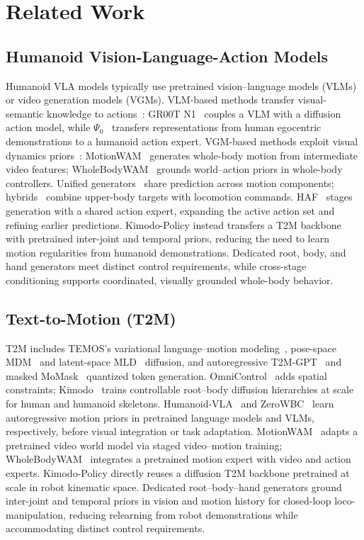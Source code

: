 \section{Related Work}
\label{sec:related_work}


% 

\subsection{Humanoid Vision-Language-Action Models}
Humanoid VLA models typically use pretrained vision--language models (VLMs) or video generation models (VGMs).
VLM-based methods transfer visual-semantic knowledge to actions~\cite{grootn1,psi0,humanoidexo,openhlm}: GR00T N1~\cite{grootn1} couples a VLM with a diffusion action model, while $\Psi_0$~\cite{psi0} transfers representations from human egocentric demonstrations to a humanoid action expert.
VGM-based methods exploit visual dynamics priors~\cite{motionwam,wholebodywam_wbc}: MotionWAM~\cite{motionwam} generates whole-body motion from intermediate video features; WholeBodyWAM~\cite{wholebodywam_wbc} grounds world--action priors in whole-body controllers.
Unified generators~\cite{openhlm,motionwam} share prediction across motion components; hybrids~\cite{humanoidexo,wholebodyvla} combine upper-body targets with locomotion commands.
HAF~\cite{haf} stages generation with a shared action expert, expanding the active action set and refining earlier predictions.
Kimodo-Policy instead transfers a T2M backbone with pretrained inter-joint and temporal priors, reducing the need to learn motion regularities from humanoid demonstrations. Dedicated root, body, and hand generators meet distinct control requirements, while cross-stage conditioning supports coordinated, visually grounded whole-body behavior.

% 

\subsection{Text-to-Motion (T2M)}
T2M includes TEMOS's variational language--motion modeling~\cite{temos}, pose-space MDM~\cite{mdm} and latent-space MLD~\cite{mld} diffusion, and autoregressive T2M-GPT~\cite{t2mgpt} and masked MoMask~\cite{momask} quantized token generation. OmniControl~\cite{omnicontrol} adds spatial constraints; Kimodo~\cite{kimodo} trains controllable root--body diffusion hierarchies at scale for human and humanoid skeletons. Humanoid-VLA~\cite{humanoidvla} and ZeroWBC~\cite{zerowbc} learn autoregressive motion priors in pretrained language models and VLMs, respectively, before visual integration or task adaptation. MotionWAM~\cite{motionwam} adapts a pretrained video world model via staged video--motion training; WholeBodyWAM~\cite{wholebodywam_motionpriors} integrates a pretrained motion expert with video and action experts. Kimodo-Policy directly reuses a diffusion T2M backbone pretrained at scale in robot kinematic space. Dedicated root--body--hand generators ground inter-joint and temporal priors in vision and motion history for closed-loop loco-manipulation, reducing relearning from robot demonstrations while accommodating distinct control requirements.
